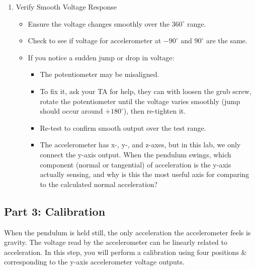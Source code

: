 \documentclass{article} %
\begin{document}
\begin{enumerate}
    \item Verify Smooth Voltage Response
    \begin{itemize}
        \item Ensure the voltage changes smoothly over the $360^\circ$ range.
        \item Check to see if voltage for accelerometer at $-90^\circ$ and $90^\circ$ are the same.
        \item If you notice a sudden jump or drop in voltage:
        \begin{itemize}
            \item The potentiometer may be misaligned.
            \item To fix it, ask your TA for help, they can with loosen the grub screw, rotate the potentiometer until the voltage varies smoothly (jump should occur around $+180^\circ$), then re-tighten it.
            \item Re-test to confirm smooth output over the test range.
            \item[\textbf{Q}] The accelerometer has x-, y-, and z-axes, but in this lab, we only connect the y-axis output. When the pendulum swings, which component (normal or tangential) of acceleration is the y-axis actually sensing, and why is this the most useful axis for comparing to the calculated normal acceleration?
        \end{itemize}
    \end{itemize}
\end{enumerate}


\subsection{Part 3: Calibration}
When the pendulum is held still, the only acceleration the accelerometer feels is gravity. The voltage read by the accelerometer can be linearly related to acceleration. In this step, you will perform a calibration using four positions & corresponding to the y-axis accelerometer voltage outputs.
\end{document}
